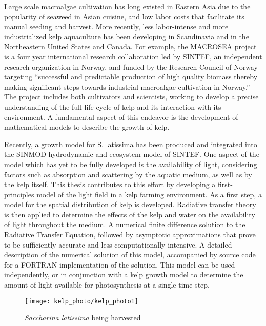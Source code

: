 Large scale macroalgae cultivation has long existed in Eastern Asia due to the popularity of seaweed in Asian cuisine, and low labor costs that facilitate its manual seeding and harvest.
  More recently, less labor-intense and more industrialized kelp aquaculture has been developing in Scandinavia and in the Northeastern United States and Canada.
For example, the MACROSEA project is a four year international research collaboration led by SINTEF, an independent research organization in Norway, and funded by the Research Council of Norway targeting ``successful and predictable production of high quality biomass thereby making significant steps towards industrial macroalgae cultivation in Norway.'' %
The project includes both cultivators and scientists, working to develop a precise understanding of the full life cycle of kelp and its interaction with its environment.
A fundamental aspect of this endeavor is the development of mathematical models to describe the growth of kelp.

Recently, a growth model\cite{broch_modelling_2012} for S. latissima has been produced and integrated into the SINMOD\cite{wassmann_modelling_2006} hydrodynamic and ecosystem model of SINTEF.
One aspect of the model which has yet to be fully developed is the availability of light, considering factors such as absorption and scattering by the aquatic medium, as well as by the kelp itself.
This thesis contributes to this effort by developing a first-principles model of the light field in a kelp farming environment.
As a first step, a model for the spatial distribution of kelp is developed.
Radiative transfer theory is then applied to determine the effects of the kelp and water on the availability of light throughout the medium.
A numerical finite difference solution to the Radiative Transfer Equation, followed by asymptotic approximations that prove to be sufficiently accurate and less computationally intensive.
A detailed description of the numerical solution of this model, accompanied by source code for a FORTRAN implementation of the solution.
This model can be used independently, or in conjunction with a kelp growth model to determine the amount of light available for photosynthesis at a single time step.

\begin{figure}[h]
  \centering
  \texttt{[image: kelp\_photo/kelp\_photo1]}
  \caption{\textit{Saccharina latissima} being harvested}
\end{figure}


